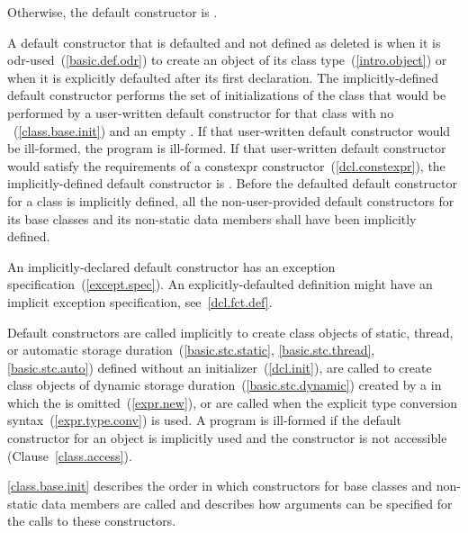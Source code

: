 Otherwise, the default constructor is
.

\pnum
{}%
A default constructor
that is defaulted and not defined as deleted
is
when it is odr-used~(\ref{basic.def.odr})
to create an object of its class type~(\ref{intro.object})
or when it is explicitly defaulted after its first declaration.
The implicitly-defined default constructor performs the set of
initializations of the class that would be performed by a user-written default
constructor for that class with no
~(\ref{class.base.init}) and an empty
.
If that user-written default constructor would be ill-formed,
the program is ill-formed.
If that user-written default constructor would satisfy the requirements
of a constexpr constructor~(\ref{dcl.constexpr}), the implicitly-defined
default constructor is .
Before the defaulted default constructor for a class is
implicitly defined,
all the non-user-provided default constructors for its base classes and
its non-static data members shall have been implicitly defined.
\begin{note}
An implicitly-declared default constructor has an
exception specification~(\ref{except.spec}).
An explicitly-defaulted definition might have an
implicit exception specification, see~\ref{dcl.fct.def}.
\end{note}

\pnum
{}%
Default constructors are called implicitly to create class objects of static, thread,
or automatic storage duration~(\ref{basic.stc.static}, \ref{basic.stc.thread}, \ref{basic.stc.auto}) defined
without an initializer~(\ref{dcl.init}),
are called to create class objects of dynamic storage duration~(\ref{basic.stc.dynamic}) created by a
in which the
is omitted~(\ref{expr.new}), or
are called when the explicit type conversion syntax~(\ref{expr.type.conv}) is
used.
A program is ill-formed if the default constructor for an object
is implicitly used and the constructor is not accessible (Clause~\ref{class.access}).

\pnum
\begin{note}
%
%
\ref{class.base.init} describes the order in which constructors for base
classes and non-static data members are called and
describes how arguments can be specified for the calls to these constructors.
\end{note}

